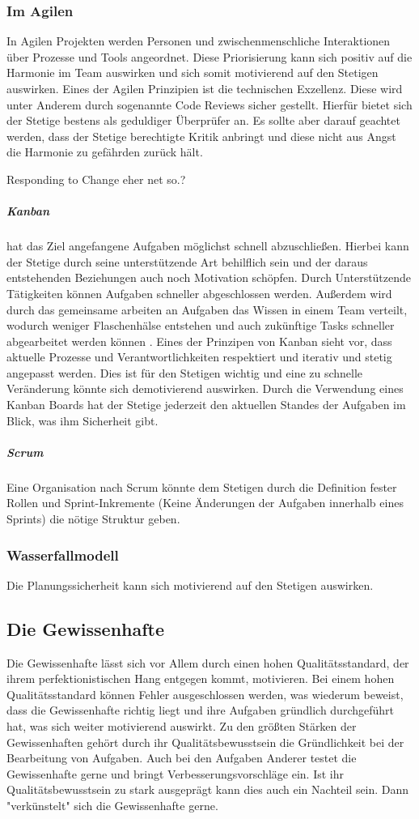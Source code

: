 \documentclass[twocolumn,10pt]{asme2ej}
\begin{document}
\subsubsection{Im Agilen}
In Agilen Projekten werden Personen und zwischenmenschliche Interaktionen über Prozesse und Tools angeordnet. Diese Priorisierung kann sich positiv auf die Harmonie im Team auswirken und sich somit motivierend auf den Stetigen auswirken. Eines der Agilen Prinzipien ist die technischen Exzellenz. Diese wird unter Anderem durch sogenannte Code Reviews sicher gestellt. Hierfür bietet sich der Stetige bestens als geduldiger Überprüfer an. Es sollte aber darauf geachtet werden, dass der Stetige berechtigte Kritik anbringt und diese nicht aus Angst die Harmonie zu gefährden zurück hält. 

Responding to Change eher net so.?


\subparagraph{Kanban} hat das Ziel angefangene Aufgaben möglichst schnell abzuschließen. Hierbei kann der Stetige durch seine unterstützende Art behilflich sein und der daraus entstehenden Beziehungen  auch noch Motivation schöpfen. Durch Unterstützende Tätigkeiten können Aufgaben schneller abgeschlossen werden. Außerdem wird durch das gemeinsame arbeiten an Aufgaben das Wissen in einem Team verteilt, wodurch weniger Flaschenhälse entstehen und auch zukünftige Tasks schneller abgearbeitet werden können \cite{kanban}. Eines der Prinzipen von Kanban sieht vor, dass aktuelle Prozesse und Verantwortlichkeiten respektiert und iterativ und stetig angepasst werden. Dies ist für den Stetigen wichtig und eine zu schnelle Veränderung könnte sich demotivierend auswirken. Durch die Verwendung eines Kanban Boards hat der Stetige jederzeit den aktuellen Standes der Aufgaben im Blick, was ihm Sicherheit gibt.

\subparagraph{Scrum} Eine Organisation nach Scrum könnte dem Stetigen durch die Definition fester Rollen und Sprint-Inkremente (Keine Änderungen der Aufgaben innerhalb eines Sprints) die nötige Struktur geben.

\subsubsection{Wasserfallmodell}
Die Planungssicherheit kann sich motivierend auf den Stetigen auswirken.
 
\subsection{Die Gewissenhafte}
Die Gewissenhafte lässt sich vor Allem durch einen hohen Qualitätsstandard, der ihrem perfektionistischen Hang entgegen kommt, motivieren. Bei einem hohen Qualitätsstandard können Fehler ausgeschlossen werden, was wiederum beweist, dass die Gewissenhafte richtig liegt und ihre Aufgaben gründlich durchgeführt hat, was sich weiter motivierend auswirkt. Zu den größten Stärken der Gewissenhaften gehört durch ihr Qualitätsbewusstsein die Gründlichkeit bei der Bearbeitung von Aufgaben. Auch bei den Aufgaben Anderer testet die Gewissenhafte gerne und bringt Verbesserungsvorschläge ein. Ist ihr Qualitätsbewusstsein zu stark ausgeprägt kann dies auch ein Nachteil sein. Dann "verkünstelt" sich die Gewissenhafte gerne.
\end{document}
